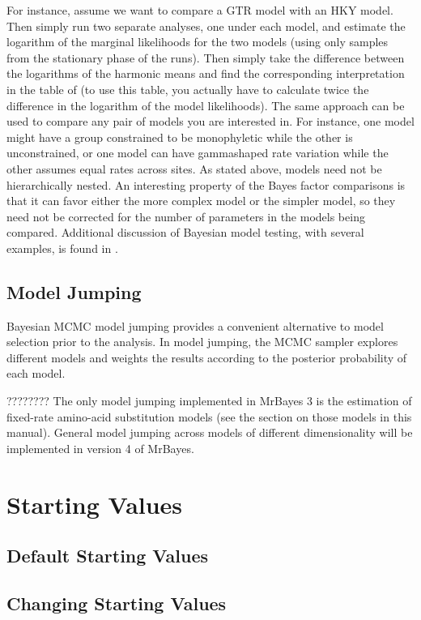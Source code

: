 \documentclass[12pt]{book}
\begin{document}
For instance, assume we want to compare a GTR model with an HKY model. Then
simply run two separate analyses, one under each model, and estimate the logarithm of
the marginal likelihoods for the two models (using only samples from the stationary
phase of the runs). Then simply take the difference between the logarithms of the
harmonic means and find the corresponding interpretation in the table of \citet{kass95}
(to use this table, you actually have to calculate twice the difference in the
logarithm of the model likelihoods). The same approach can be used to compare any pair
of models you are interested in. For instance, one model might have a group constrained
to be monophyletic while the other is unconstrained, or one model can have gammashaped
rate variation while the other assumes equal rates across sites. As stated above,
models need not be hierarchically nested. An interesting property of the Bayes factor
comparisons is that it can favor either the more complex model or the simpler model, so
they need not be corrected for the number of parameters in the models being compared.
Additional discussion of Bayesian model testing, with several examples, is found in
\citet{nylander04}.


\subsection{Model Jumping}

Bayesian MCMC model jumping provides a convenient alternative to model selection
prior to the analysis. In model jumping, the MCMC sampler explores different models
and weights the results according to the posterior probability of each model.

???????? The only model jumping implemented in MrBayes 3 is the estimation of fixed-rate
amino-acid substitution models (see the section on those models in this manual). General
model jumping across models of different dimensionality will be implemented in version
4 of MrBayes.


\section{Starting Values}

\subsection{Default Starting Values}

\subsection{Changing Starting Values}
\end{document}
